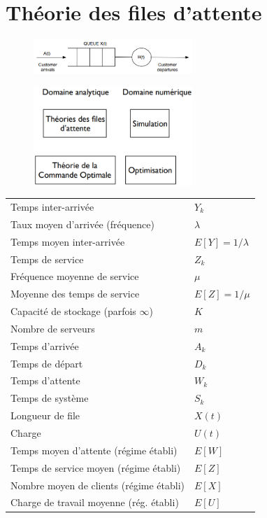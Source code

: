 \documentclass[resume]{subfiles}
\begin{document}
\section{Théorie des files d'attente}
\begin{figure}[H]
\centering
\includegraphics[width=6cm]{img_17.png}
\end{figure}
\begin{figure}[H]
\centering
\includegraphics[width=6.00cm]{img_18.png}
\end{figure}
\begin{center}
\small
\begin{tabular}{ll}
Temps inter-arrivée & $Y_k$\\
Taux moyen d'arrivée (fréquence) & $\lambda$\\
Temps moyen inter-arrivée & $E[Y]=1/\lambda$\\
Temps de service & $Z_k$\\
Fréquence moyenne de service & $\mu$\\
Moyenne des temps de service & $E[Z]=1/\mu$\\
Capacité de stockage (parfois $\infty$) & $K$\\
Nombre de serveurs & $m$\\
Temps d'arrivée & $A_k$\\
Temps de départ & $D_k$\\
Temps d'attente & $W_k$\\
Temps de système & $S_k$\\
Longueur de file & $X(t)$\\
Charge & $U(t)$\\
Temps moyen d'attente (régime établi) & $E[W]$\\
Temps de service moyen (régime établi) & $E[Z]$\\
Nombre moyen de clients (régime établi) & $E[X]$\\
Charge de travail moyenne (rég. établi) & $E[U]$
\end{tabular}
\end{center}
\end{document}
